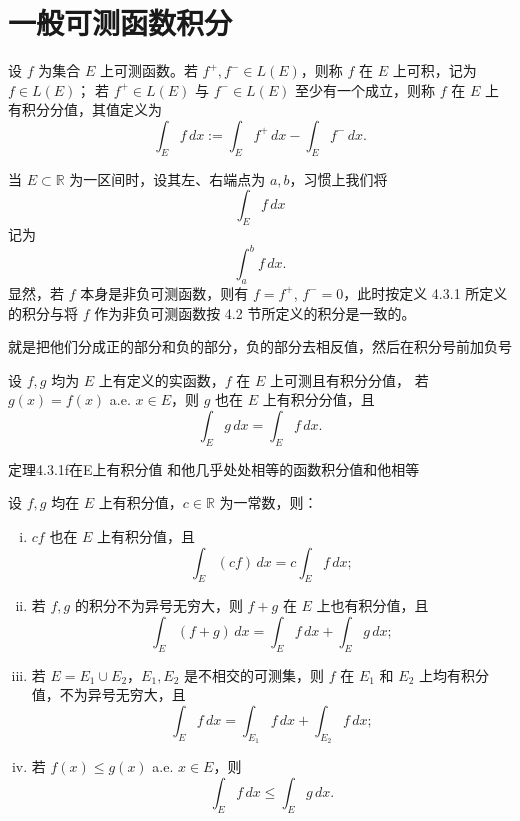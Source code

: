 \documentclass[lang=cn,10pt]{elegantbook}
\begin{document}
\section{一般可测函数积分}
\begin{definition}[4.3.1]
设 $f$ 为集合 $E$ 上可测函数。若 $f^{+}, f^{-} \in L(E)$，则称 $f$ 在 $E$ 上可积，记为 $f \in L(E)$；  
若 $f^{+} \in L(E)$ 与 $f^{-} \in L(E)$ 至少有一个成立，则称 $f$ 在 $E$ 上有积分分值，其值定义为
\[
\int_E f\,dx := \int_E f^{+}\,dx - \int_E f^{-}\,dx .
\]
\end{definition}

\begin{remark}
当 $E \subset \mathbb{R}$ 为一区间时，设其左、右端点为 $a,b$，习惯上我们将
\[
\int_E f\,dx
\]
记为
\[
\int_a^b f\,dx.
\]
显然，若 $f$ 本身是非负可测函数，则有 $f = f^{+}$, $f^{-} = 0$，此时按定义 4.3.1 所定义的积分与将 $f$ 作为非负可测函数按 4.2 节所定义的积分是一致的。
\end{remark}
就是把他们分成正的部分和负的部分，负的部分去相反值，然后在积分号前加负号
\begin{theorem}[4.3.1]
设 $f, g$ 均为 $E$ 上有定义的实函数，$f$ 在 $E$ 上可测且有积分分值，  
若 $g(x) = f(x)$ a.e. $x \in E$，则 $g$ 也在 $E$ 上有积分分值，且  
\[
\int_E g\,dx = \int_E f\,dx.
\]
\end{theorem}
定理4.3.1f在E上有积分值 和他几乎处处相等的函数积分值和他相等
\begin{theorem}[4.3.2 积分的基本性质]
设 $f, g$ 均在 $E$ 上有积分值，$c \in \mathbb{R}$ 为一常数，则：

\begin{enumerate}[(i)]
    \item $cf$ 也在 $E$ 上有积分值，且
    \[
    \int_E (cf)\,dx = c \int_E f\,dx;
    \]
    
    \item 若 $f, g$ 的积分不为异号无穷大，则 $f + g$ 在 $E$ 上也有积分值，且
    \[
    \int_E (f+g)\,dx = \int_E f\,dx + \int_E g\,dx;
    \]
    
    \item 若 $E = E_1 \cup E_2$，$E_1, E_2$ 是不相交的可测集，则 $f$ 在 $E_1$ 和 $E_2$ 上均有积分值，不为异号无穷大，且
    \[
    \int_E f\,dx = \int_{E_1} f\,dx + \int_{E_2} f\,dx;
    \]
    
    \item 若 $f(x) \le g(x)$ a.e. $x \in E$，则
    \[
    \int_E f\,dx \le \int_E g\,dx.
    \]
\end{enumerate}
\end{theorem}\\
\end{document}
